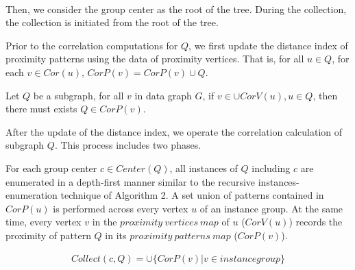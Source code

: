 ~\newline 
~\newline

%
Then, we consider the group center as the root of the tree. During the collection, the collection is initiated from the root of the tree.


\par Prior to the correlation computations for $Q$, we first update the distance index of proximity patterns using the data of proximity vertices. That is, for all $u\in Q$, for each $v\in Cor(u)$, $CorP(v)=CorP(v)\cup Q$.
\begin{lma}
\label{lemma:distance bidirection relation between vertices and patterns}
Let $Q$ be a subgraph, for all $v$ in data graph $G$, if $v\in \cup CorV(u),u\in Q$, then there must exists $Q\in CorP(v)$.
\end{lma}
\par After the update of the distance index, we operate the correlation calculation of subgraph $Q$. This process includes two phases.

 For each group center $c\in Center(Q)$, all instances of $Q$ including $c$ are enumerated in a depth-first manner similar to the recursive instances-enumeration technique of Algorithm 2. A set union of patterns contained in $CorP(u)$ is performed across every vertex $u$ of an instance group. At the same time, every vertex $v$ in the $proximity\ vertices\ map$ of $u$ ($CorV(u)$) records the proximity of pattern $Q$ in its $proximity\ patterns\ map$ ($CorP(v)$).

\begin{align}
Collect(c,Q)=\cup \{CorP(v)|v\in instance group\}
\end{align}

